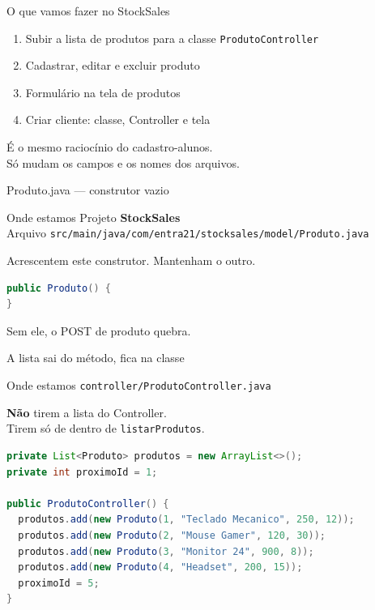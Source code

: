 \documentclass[aspectratio=169,11pt]{beamer}
\newcommand{\onde}[1]{%
  \begin{block}{Onde estamos}
    #1
  \end{block}
}
\begin{document}
\begin{frame}{O que vamos fazer no StockSales}
  \begin{enumerate}
    \item Subir a lista de produtos para a classe
          \texttt{ProdutoController}
    \item Cadastrar, editar e excluir produto
    \item Formulário na tela de produtos
    \item Criar cliente: classe, Controller e tela
  \end{enumerate}

  \vspace{0.5em}
  É o mesmo raciocínio do cadastro-alunos.\\
  Só mudam os campos e os nomes dos arquivos.
\end{frame}

\begin{frame}[fragile]{Produto.java --- construtor vazio}
  \onde{Projeto \textbf{StockSales}\\
        Arquivo \texttt{src/main/java/com/entra21/stocksales/model/Produto.java}}

  Acrescentem este construtor. Mantenham o outro.

\begin{lstlisting}[language=Java,basicstyle=\ttfamily\footnotesize]
public Produto() {
}
\end{lstlisting}

  Sem ele, o POST de produto quebra.
\end{frame}

\begin{frame}[fragile]{A lista sai do método, fica na classe}
  \onde{\texttt{controller/ProdutoController.java}}

  \textbf{Não} tirem a lista do Controller.\\
  Tirem só de dentro de \texttt{listarProdutos}.

\begin{lstlisting}[language=Java,basicstyle=\ttfamily\footnotesize]
private List<Produto> produtos = new ArrayList<>();
private int proximoId = 1;

public ProdutoController() {
  produtos.add(new Produto(1, "Teclado Mecanico", 250, 12));
  produtos.add(new Produto(2, "Mouse Gamer", 120, 30));
  produtos.add(new Produto(3, "Monitor 24", 900, 8));
  produtos.add(new Produto(4, "Headset", 200, 15));
  proximoId = 5;
}
\end{lstlisting}
\end{frame}
\end{document}
